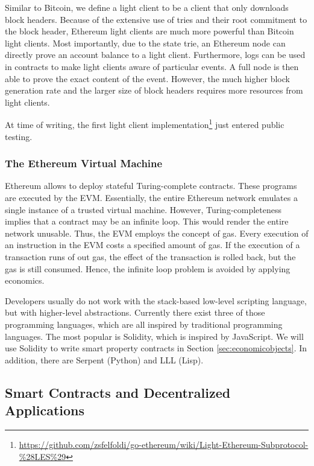 Similar to Bitcoin, we define a light client to be a client that only downloads block headers. Because of the extensive use of tries and their root commitment to the block header, Ethereum light clients are much more powerful than Bitcoin light clients. 
Most importantly, due to the state trie, an Ethereum node can directly prove an account balance to a light client. Furthermore, logs can be used in contracts to make light clients aware of particular events. A full node is then able to prove the exact content of the event.
However, the much higher block generation rate and the larger size of block headers requires more resources from light clients.

At time of writing, the first light client implementation\footnote{\url{https://github.com/zsfelfoldi/go-ethereum/wiki/Light-Ethereum-Subprotocol-\%28LES\%29}} just entered public testing.

\subsubsection{The Ethereum Virtual Machine}

Ethereum allows to deploy stateful Turing-complete contracts. These programs are executed by the \ac{EVM}. Essentially, the entire Ethereum network emulates a single instance of a trusted virtual machine. 
However, Turing-completeness implies that a contract may be an infinite loop. This would render the entire network unusable. Thus, the \ac{EVM} employs the concept of gas. Every execution of an instruction in the \ac{EVM} costs a specified amount of gas. If the execution of a transaction runs of out gas, the effect of the transaction is rolled back, but the gas is still consumed. Hence, the infinite loop problem is avoided by applying economics.

Developers usually do not work with the stack-based low-level scripting language, but with higher-level abstractions. Currently there exist three of those programming languages, which are all inspired by traditional programming languages. The most popular is Solidity, which is inspired by JavaScript. We will use Solidity to write smart property contracts in Section \ref{sec:economicobjects}. In addition, there are Serpent (Python) and LLL (Lisp).


\subsection{Smart Contracts and Decentralized Applications}
\label{sec:smartcontracts}

